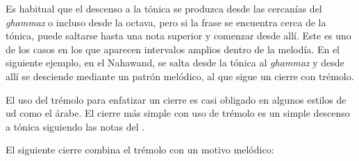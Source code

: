 Es habitual que el descenso a la tónica se produzca desde las cercanías del \emph{ghammaz} o incluso desde la octava, pero si la frase se encuentra cerca de la tónica, puede saltarse hasta una nota superior y comenzar desde allí. Este es uno de los casos en los que aparecen intervalos amplios dentro de la melodía. En el siguiente ejemplo, en el \maqam Nahawand, se salta desde la tónica al \emph{ghammaz} y desde allí se desciende mediante un patrón melódico, al que sigue un cierre con trémolo.


\begin{center}
\end{center}


El uso del trémolo para enfatizar un cierre es casi obligado en algunos estilos de ud como el árabe. El cierre más simple con uso de trémolo es un simple descenso a tónica siguiendo las notas del \maqamb.


\begin{center}
\end{center}


El siguiente cierre combina el trémolo con un motivo melódico:


\begin{center}
\end{center}



